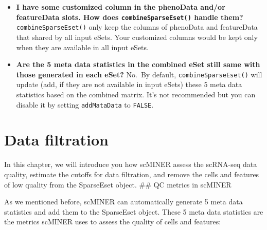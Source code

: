 \documentclass[
  12pt,
]{book}
\providecommand{\tightlist}{%
  \setlength{\itemsep}{0pt}\setlength{\parskip}{0pt}}
\begin{document}
\begin{itemize}
\tightlist
\item
  \textbf{I have some customized column in the phenoData and/or featureData slots. How does \texttt{combineSparseEset()} handle them?} \texttt{combineSparseEset()} only keep the columns of phenoData and featureData that shared by all input eSets. Your customized columns would be kept only when they are available in all input eSets.
\item
  \textbf{Are the 5 meta data statistics in the combined eSet still same with those generated in each eSet?} No.~By default, \texttt{combineSparseEset()} will update (add, if they are not available in input eSets) these 5 meta data statistics based on the combined matrix. It's not recommended but you can disable it by setting \texttt{addMataData} to \texttt{FALSE}.
\end{itemize}

\chapter{Data filtration}\label{data-filtration}

In this chapter, we will introduce you how scMINER assess the scRNA-seq data quality, estimate the cutoffs for data filtration, and remove the cells and features of low quality from the SparseEset object.
\#\# QC metrics in scMINER

As we mentioned before, scMINER can automatically generate 5 meta data statistics and add them to the SparseEset object. These 5 meta data statistics are the metrics scMINER uses to assess the quality of cells and features:
\end{document}
